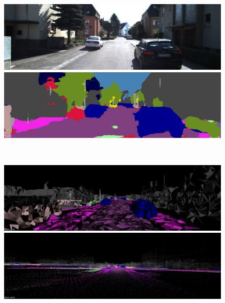 \begin{figure}[htbp]
 \begin{minipage}[b]{0.50\hsize}
 \begin{center}
  \includegraphics[keepaspectratio, scale=0.18]{./picture/bgrimage/bgrimage8.jpg}
  \end{center}
 \end{minipage}
 \begin{minipage}[b]{0.5\hsize}
 \begin{center}
  \includegraphics[keepaspectratio, scale=0.18]{./picture/segimage/image8.jpg}
  \end{center}
 \end{minipage} \\
 \begin{minipage}[b]{0.50\hsize}
 \begin{center}
  \includegraphics[keepaspectratio, scale=0.18]{./picture/mesh_map_image/image8.jpg}
  \end{center}
 \end{minipage}
 \begin{minipage}[b]{0.50\hsize}
 \begin{center}
  \includegraphics[keepaspectratio, scale=0.18]{./picture/point_map_image/image8.jpg}

\end{center}
\end{minipage}
\end{figure}
